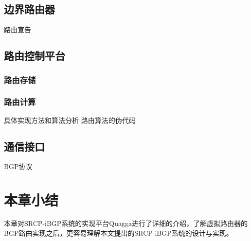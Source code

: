 \subsection{边界路由器}
路由宣告
\subsection{路由控制平台}
\subsubsection{路由存储}
\subsubsection{路由计算}
具体实现方法和算法分析
路由算法的伪代码

\subsection{通信接口}
BGP协议
\section{本章小结}
本章对SRCP-iBGP系统的实现平台Quagga进行了详细的介绍，了解虚拟路由器的BGP路由实现之后，更容易理解本文提出的SRCP-iBGP系统的设计与实现。
